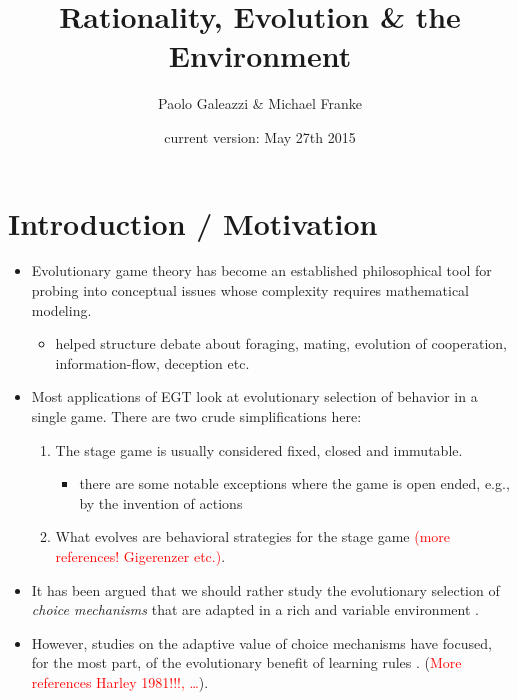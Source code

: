 \documentclass[fleqn,reqno,11pt]{article}
\title{Rationality, Evolution \& the Environment}
\author{Paolo Galeazzi \& Michael Franke}
\date{current version: May 27th 2015}
\newcommand{\myalert}[1]{\textcolor{red}{#1}}
\begin{document}
\maketitle


\section{Introduction / Motivation}

\begin{itemize}
\item Evolutionary game theory has become an established philosophical tool for probing into
  conceptual issues whose complexity requires mathematical modeling.
  \begin{itemize}
  \item helped structure debate about foraging, mating, evolution of cooperation,
    information-flow, deception etc.
  \end{itemize}
\item Most applications of EGT look at evolutionary selection of behavior in a single
  game. There are two crude simplifications here:
  \begin{enumerate}
  \item The stage game is usually considered fixed, closed and immutable.
    \begin{itemize}
    \item there are some notable exceptions where the game is open ended, e.g., by the
      invention of actions \citep{WordenLevin2007:Evolutionary-es,
        McKenzie-AlexanderSkymrs2012:Inventing-New-S}
    \end{itemize}
  \item What evolves are behavioral strategies for the stage game \citep[what][call the
    ``behavioral gamit'']{FawcettHamblin2013:Exposing-the-be} \myalert{(more references!
      Gigerenzer etc.)}.
  \end{enumerate}
\item It has been argued that we should rather study the evolutionary selection of \emph{choice
    mechanisms} that are adapted in a rich and variable environment
  \citep[e.g.][]{FawcettHamblin2013:Exposing-the-be,McNamara2013:Towards-a-Riche}.
\item However, studies on the adaptive value of choice mechanisms have focused, for the most
  part, of the evolutionary benefit of learning rules
  \citep[e.g.][]{ZollmanSmead2010:Plasticity-and-,SmeadZollman2013:The-Stability-o}. (\myalert{More references Harley 1981!!!, \dots}). 

\end{itemize}
\end{document}
